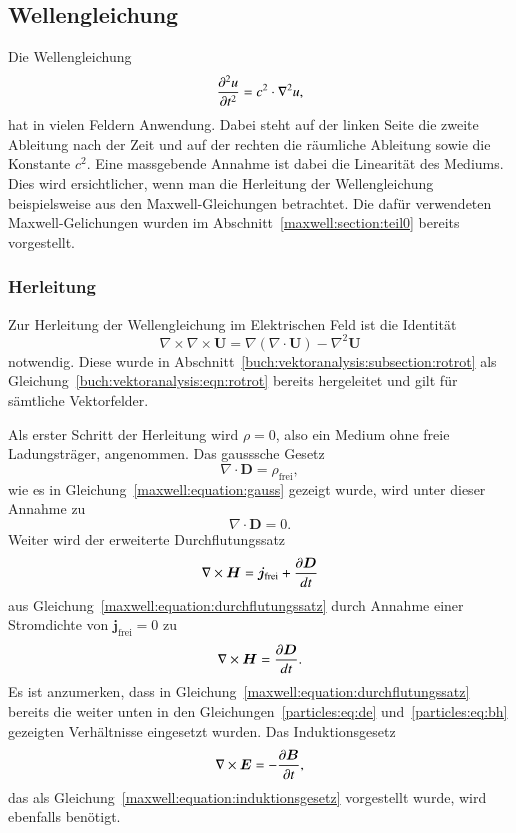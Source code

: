 \subsection{Wellengleichung}\label{particles:section:lin-medium:wellengleichung}
Die Wellengleichung 
\begin{equation}
    \frac{\d^2 u}{\d t^2} = c^2 \cdot \nabla^2 u, \label{particles:eq:wellengleichung}
\end{equation}
hat in vielen Feldern Anwendung.
Dabei steht auf der linken Seite die zweite Ableitung nach der Zeit und auf der rechten die räumliche Ableitung sowie die Konstante $c^2$.
Eine massgebende Annahme ist dabei die Linearität des Mediums.
Dies wird ersichtlicher, wenn man die Herleitung der Wellengleichung beispielsweise aus den Maxwell-Gleichungen betrachtet.
Die dafür verwendeten Maxwell-Gelichungen wurden im Abschnitt~\ref{maxwell:section:teil0} bereits vorgestellt.


\subsubsection{Herleitung}
Zur Herleitung der Wellengleichung im Elektrischen Feld ist die Identität
\begin{equation}
    \nabla \times \nabla \times \boldsymbol{U} = \nabla(\nabla \cdot \boldsymbol{U}) - \nabla^2 \boldsymbol{U}\label{particles:eq:rot-identity}
\end{equation}
notwendig. 
Diese wurde in Abschnitt~\ref{buch:vektoranalysis:subsection:rotrot} als Gleichung~\ref{buch:vektoranalysis:eqn:rotrot} bereits hergeleitet und gilt für sämtliche Vektorfelder.

Als erster Schritt der Herleitung wird $\rho = 0$, also ein Medium ohne freie Ladungsträger, angenommen.
Das gausssche Gesetz
\[
    \nabla \cdot \boldsymbol{D} = \rho_\text{frei},
\]
wie es in Gleichung~\ref{maxwell:equation:gauss} gezeigt wurde, wird unter dieser Annahme zu
\begin{equation}
    \nabla \cdot \boldsymbol{D} = 0.\label{particles:eq:gauss}
\end{equation}
Weiter wird der erweiterte Durchflutungssatz
\[
    \nabla \times \boldsymbol{H} = \boldsymbol{j}_\text{frei} + \frac{\d \boldsymbol{D}}{dt}
\]
aus Gleichung~\ref{maxwell:equation:durchflutungssatz} durch Annahme einer Stromdichte von $\boldsymbol{j}_\text{frei} = 0$ zu
\begin{equation}
    \nabla \times \boldsymbol{H} = \frac{\d \boldsymbol{D}}{dt}.\label{particles:eq:durchflutungssatz}
\end{equation}
Es ist anzumerken, dass in Gleichung~\ref{maxwell:equation:durchflutungssatz} bereits die weiter unten in den Gleichungen~\ref{particles:eq:de} und~\ref{particles:eq:bh} gezeigten Verhältnisse eingesetzt wurden.
Das Induktionsgesetz
\begin{equation}
    \nabla \times \boldsymbol{E} = -\frac{\d \boldsymbol{B}}{\d t}\label{particles:eq:induktionsgesetz},
\end{equation}
das als Gleichung~\ref{maxwell:equation:induktionsgesetz} vorgestellt wurde, wird ebenfalls benötigt.

